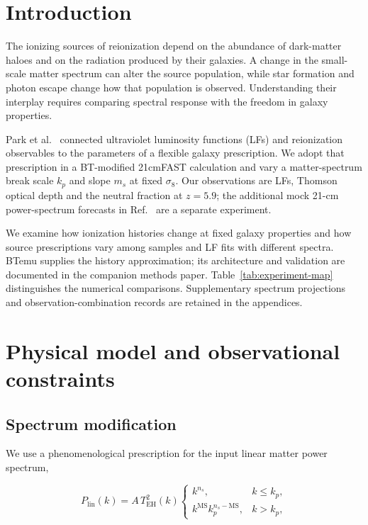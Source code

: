 \section{Introduction}\label{introduction}

The ionizing sources of reionization depend on the abundance of dark-matter haloes and on the radiation produced by their galaxies. A change in the small-scale matter spectrum can alter the source population, while star formation and photon escape change how that population is observed. Understanding their interplay requires comparing spectral response with the freedom in galaxy properties.

Park et al.~\cite{Park2019} connected ultraviolet luminosity functions (LFs) and reionization observables to the parameters of a flexible galaxy prescription. We adopt that prescription in a BT-modified 21cmFAST calculation \cite{Mesinger2011,Murray2020} and vary a matter-spectrum break scale $k_p$ and slope $m_s$ at fixed $\sigma_8$. Our observations are LFs, Thomson optical depth and the neutral fraction at $z=5.9$; the additional mock 21-cm power-spectrum forecasts in Ref.~\cite{Park2019} are a separate experiment.

We examine how ionization histories change at fixed galaxy properties and how source prescriptions vary among samples and LF fits with different spectra. BTemu supplies the history approximation; its architecture and validation are documented in the companion methods paper. Table~\ref{tab:experiment-map} distinguishes the numerical comparisons. Supplementary spectrum projections and observation-combination records are retained in the appendices.

\section{Physical model and observational constraints}\label{physical-model-and-simulations}

\subsection{Spectrum modification}\label{spectrum-modification}

We use a phenomenological prescription for the input linear matter power spectrum,

\[
P_{\mathrm{lin}}(k)=A\,T_{\mathrm{EH}}^2(k)
\begin{cases}
k^{n_s}, & k\leq k_p,\\
k^{\mathrm{MS}}k_p^{n_s-\mathrm{MS}}, & k>k_p,
\end{cases}
\]

